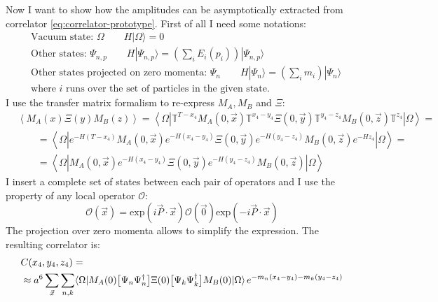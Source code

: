 \documentclass[english, LaM, oneside, noexaminfo]{sapthesis}
\newcommand{\la}{\langle}
\newcommand{\ra}{\rangle}
\begin{document}
\newline
Now I want to show how the amplitudes can be asymptotically extracted \cite{montvay-munster} from correlator \ref{eq:correlator-prototype}.
First of all I need some notations:
\begin{equation*}
    \begin{split}
        & \text{Vacuum state: } \Omega \qquad H|\Omega\ra = 0 \\
        & \text{Other states: } \Psi_{n,p} \qquad H|\Psi_{n,p}\ra = \left(\sum_i E_i(p_i)\right)|\Psi_{n,p}\ra \\
        & \text{Other states projected on zero momenta: } \Psi_{n} \qquad H|\Psi_{n}\ra = \left(\sum_i m_i\right)|\Psi_{n}\ra \\
        & \text{where $i$ runs over the set of particles in the given state.}
    \end{split}
\end{equation*}
I use the transfer matrix formalism to re-express $M_A, M_B$ and $\Xi$:
\begin{equation*}
    \begin{split}
        & \left\la M_A (x)\Xi (y)M_B (z) \right\ra = \left\la \Omega | \mathbb{T}^{T-x_4} M_A (0,\vec x) \mathbb{T}^{x_4-y_4} \Xi (0,\vec y) \mathbb{T}^{y_4-z_4} M_B (0,\vec z) \mathbb{T}^{z_4} | \Omega \right\ra = \\
        & \qquad = \left\la \Omega | e^{-H(T-x_4)} M_A (0,\vec x) e^{-H(x_4-y_4)} \Xi (0,\vec y) e^{-H(y_4-z_4)} M_B (0,\vec z) e^{-Hz_4} | \Omega \right\ra = \\
        & \qquad = \left\la \Omega | M_A (0,\vec x) e^{-H(x_4-y_4)} \Xi (0,\vec y) e^{-H(y_4-z_4)} M_B (0,\vec z) | \Omega \right\ra
    \end{split}
\end{equation*}
I insert a complete set of states between each pair of operators and I use the property of any local operator $\mathcal{O}$:
$$\mathcal{O}(\vec x) = \text{exp}\left(i \vec P \cdot \vec x\right)\mathcal{O}(\vec 0)\text{exp}\left(-i \vec P \cdot \vec x\right)$$
The projection over zero momenta allows to simplify the expression.
The resulting correlator is:
\begin{equation*}
    \begin{split}
        & C(x_4,y_4,z_4) = \\
        & \approx a^6\sum_{\vec x}\sum_{n,k} \la \Omega | M_A (0) \big[\Psi_n \Psi_n^\dag \big] \Xi (0) \big[\Psi_k \Psi_k^\dag \big] M_B (0) | \Omega \ra \hspace*{0.5mm} e^{-m_n(x_4-y_4)-m_k(y_4-z_4)}
    \end{split}
\end{equation*}
\end{document}
